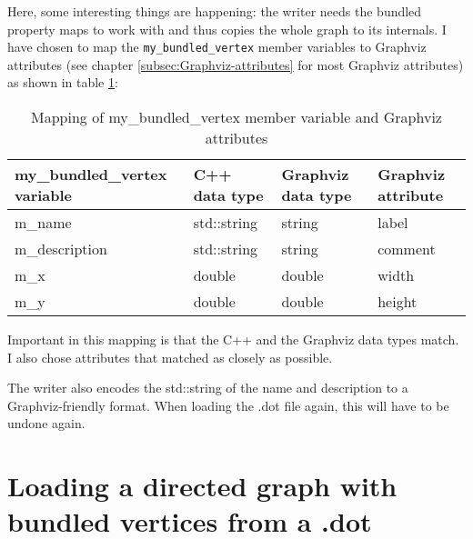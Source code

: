 

Here, some interesting things are happening: the writer needs the bundled
property maps to work with and thus copies the whole graph to its internals.
I have chosen to map the \verb;my_bundled_vertex; member variables to Graphviz
attributes (see chapter \ref{subsec:Graphviz-attributes} 
for most Graphviz attributes) as shown in table 
\ref{tab:Mapping-of-my_bundled_vertex-to-Graphviz-attributes}:


\begin{table}[h!]
  \centering
  \begin{tabular}{l l l l} 
    \hline
    my\_bundled\_vertex variable & C++ data type & Graphviz data type & Graphviz attribute \\
    \hline
    m\_name                      & std::string   & string             & label              \\
    m\_description               & std::string   & string             & comment            \\
    m\_x                         & double        & double             & width              \\
    m\_y                         & double        & double             & height             \\
    \hline
  \end{tabular}
  \caption{
    Mapping of my\_bundled\_vertex member variable and Graphviz attributes
  }
  \label{tab:Mapping-of-my_bundled_vertex-to-Graphviz-attributes}
\end{table}

Important in this mapping is that the C++ and the Graphviz data types match.
I also chose attributes that matched as closely as possible.

The writer also encodes the std::string of the name and description to a
Graphviz-friendly format.
When loading the .dot file again, this will have to be undone again.

\section{Loading a directed graph with bundled vertices from a .dot}
\label{subsec:load_directed_bundled_vertices_graph_from_dot}

